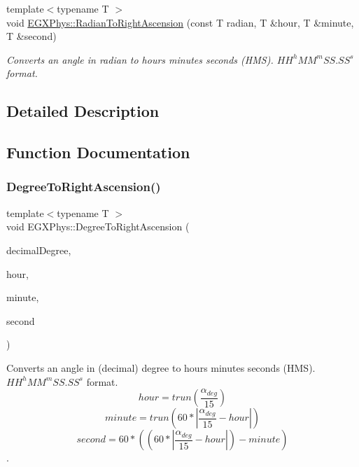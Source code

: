 \begin{DoxyCompactItemize}
{\footnotesize template$<$typename T $>$ }\\void \mbox{\hyperlink{group___e_g_x_phys-_astrophysics-_right_ascension_ga624dd87144a17d19d0100500c34da978}{E\+G\+X\+Phys\+::\+Radian\+To\+Right\+Ascension}} (const T radian, T \&hour, T \&minute, T \&second)
\begin{DoxyCompactList}\small\item\em Converts an angle in radian to hours minutes seconds (H\+MS). ${HH}^h{MM}^m{SS.SS}^s$ format. \end{DoxyCompactList}\end{DoxyCompactItemize}


\subsection{Detailed Description}


\subsection{Function Documentation}
\mbox{\label{group___e_g_x_phys-_astrophysics-_right_ascension_ga6fdbd35a030d278f396496899a1c236f}} 
\subsubsection{\texorpdfstring{Degree\+To\+Right\+Ascension()}{DegreeToRightAscension()}}
{\footnotesize\ttfamily template$<$typename T $>$ \\
void E\+G\+X\+Phys\+::\+Degree\+To\+Right\+Ascension (\begin{DoxyParamCaption}\item[{const T}]{decimal\+Degree,  }\item[{T \&}]{hour,  }\item[{T \&}]{minute,  }\item[{T \&}]{second }\end{DoxyParamCaption})}



Converts an angle in (decimal) degree to hours minutes seconds (H\+MS). ${HH}^{h}{MM}^{m}{SS.SS}^{s}$ format. \[hour=trun(\frac{\alpha_{deg}}{15})\] \[minute=trun(60 * |\frac{\alpha_{deg}}{15} - hour|)\] \[second=60 * ((60 * |\frac{\alpha_{deg}}{15} - hour|)-minute)\]. 

